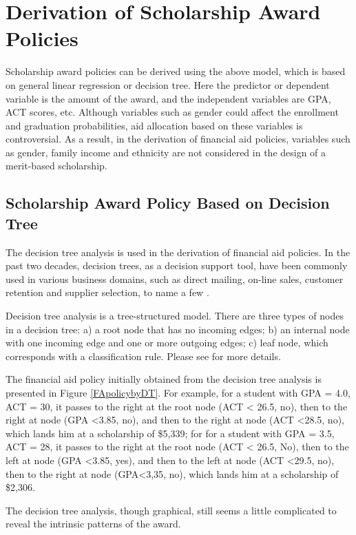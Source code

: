 \documentclass[12pt,english]{report}
\begin{document}
\section{Derivation of Scholarship Award Policies}
Scholarship award policies can be derived using the above model, which is based on general linear regression or decision tree.  Here the predictor or dependent variable is the amount of the award, and the independent variables are GPA, ACT scores, etc.  Although variables such as gender could affect the enrollment and graduation probabilities, aid allocation based on these variables is controversial. 
As a result, in the derivation of financial aid policies, variables such as gender, family income and ethnicity are not considered in the design of a merit-based scholarship.

\subsection{Scholarship Award Policy Based on Decision Tree }

The decision tree analysis is used in the derivation of financial aid 
policies.  In the past two decades, decision trees, as a decision support 
tool, have been commonly used in various business domains, such as direct 
mailing, on-line sales, customer retention and supplier selection, to 
name a few \citep{Han2011}.

Decision tree analysis is a tree-structured model. There are three types 
of nodes in a decision tree: a) a root node that has no incoming edges; 
b) an internal node with one incoming edge and one or more outgoing 
edges; c) leaf node, which corresponds with a classification rule. Please 
see \citep{Maimon2005} for more details.

The financial aid policy initially obtained from the decision tree 
analysis is presented in Figure \ref{FApolicybyDT}.  For example, for a 
student with GPA = 4.0, ACT = 30, it passes to the right at the root node 
(ACT < 26.5, no),  then to the right at node (GPA <3.85, no), and then to 
the right at node (ACT <28.5, no),  which lands him at a scholarship of 
\$5,339;   for  for a student with GPA = 3.5, ACT = 28, it passes to the 
right at the root node (ACT < 26.5, No), then to the left at node (GPA 
<3.85, yes), and then to the left at node (ACT <29.5, no), then to the 
right at node (GPA<3,35, no), which lands him at a scholarship of 
\$2,306.

The decision tree analysis, though graphical, still seems a little complicated to reveal the intrinsic patterns of the award. 
\end{document}
